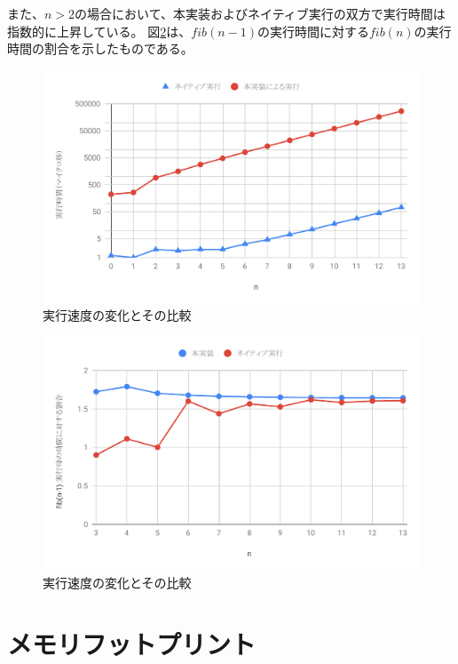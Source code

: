また、$n>2$の場合において、本実装およびネイティブ実行の双方で実行時間は指数的に上昇している。
図\ref{fig:fib_time_diff}は、$fib(n-1)$の実行時間に対する$fib(n)$の実行時間の割合を示したものである。

\begin{figure}[htbp]
  \caption{実行速度の変化とその比較}
  \label{fig:fib_time}
  \begin{center}
    \includegraphics[bb=0 0 600 370,width=12cm]{img/fib_time.pdf}
  \end{center}
\end{figure}

\begin{figure}[htbp]
  \caption{実行速度の変化とその比較}
  \label{fig:fib_time_diff}
  \begin{center}
    \includegraphics[bb=0 0 600 370,width=12cm]{img/fib_time_diff.pdf}
  \end{center}
\end{figure}

\section{メモリフットプリント}

